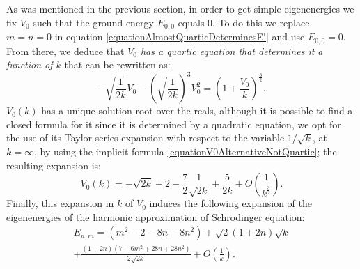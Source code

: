 As was mentioned in the previous section, in order to get simple eigenenergies we fix $V_0$ such that the ground energy $E_{0, 0}$ equals $0$. To do this we replace $m = n = 0$ in equation \eqref{equationAlmostQuarticDeterminesE'} and use $E_{0, 0} = 0$. From there, we deduce that \emph{$V_0$ has a quartic equation that determines it a function of $k$} that can be rewritten as:
\begin{equation}\label{equationV0AlternativeNotQuartic}
    - \sqrt{\frac{1}{2k}}V_0 - \left( \sqrt{\frac{1}{2k}} \right)^3 V_0^2 = \left( 1 + \frac{V_0}{k} \right)^\frac{3}{2}.
\end{equation}
$V_0(k)$ has a unique solution root over the reals, although it is possible to find a closed formula for it since it is determined by a quadratic equation, we opt for the use of its Taylor series expansion with respect to the variable $1/\sqrt{k}$, at $k = \infty$, by using the implicit formula \eqref{equationV0AlternativeNotQuartic}; the resulting expansion is:
\begin{equation}\label{equationFormulaExpansionV0functionOfK}
    V_0(k) = - \sqrt{2k} + 2 - \frac{7}{2} \frac{1}{\sqrt{2k}} + \frac{5}{2k} + O\left(\frac{1}{k^{\frac{3}{2}}}\right).
\end{equation}
Finally, this expansion in $k$ of $V_0$ induces the following expansion of the eigenenergies of the harmonic approximation of Schrodinger equation:
\begin{multline}\label{equationEigenEnergies2DSchrodingerSolutionsHarmonicApproximation}
    E_{n, m} = (m^2 - 2 -8n -8n^2) +  \sqrt{2}(1+2n)\sqrt{k}\\+ \frac{(1+2n)(7-6m^2+28n+28n^2)}{2\sqrt{2k}}+  O\left(\frac{1}{k}\right).
\end{multline}

\lin 

